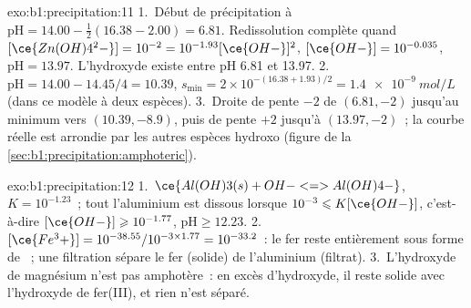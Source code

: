 \begin{solution}{exo:b1:precipitation:11}
1.~Début de précipitation à $\mathrm{pH} = 14.00 - \frac12(16.38 - 2.00) = 6.81$.
Redissolution complète quand $[\ce{Zn(OH)4^2-}] = 10^{-2} = 10^{-1.93}[\ce{OH-}]^2$,
$[\ce{OH-}] = 10^{-0.035}$, $\mathrm{pH} = 13.97$. L'hydroxyde existe
entre pH 6.81 et 13.97.
2.~$\mathrm{pH} = 14.00 - 14.45/4 = 10.39$, $s_{\min} = 2 \times
10^{-(16.38 + 1.93)/2} = \qty{1.4e-9}{mol/L}$ (dans ce modèle à deux
espèces).
3.~Droite de pente $-2$ de $(6.81, -2)$ jusqu'au minimum vers
$(10.39, -8.9)$, puis de pente $+2$ jusqu'à $(13.97, -2)$~; la courbe
réelle est arrondie par les autres espèces hydroxo (figure de la
\cref{sec:b1:precipitation:amphoteric}).
\end{solution}

\begin{solution}{exo:b1:precipitation:12}
1.~$\ce{Al(OH)3(s) + OH- <=> Al(OH)4-}$, $K = 10^{-1.23}$~; tout
l'aluminium est dissous lorsque $10^{-3} \leqslant K[\ce{OH-}]$,
c'est-à-dire
$[\ce{OH-}] \geqslant 10^{-1.77}$, $\mathrm{pH} \geqslant 12.23$.
2.~$[\ce{Fe^3+}] = 10^{-38.55}/10^{-3 \times 1.77} = 10^{-33.2}$~: le fer
reste entièrement sous forme de ~; une filtration sépare le
fer (solide) de l'aluminium (filtrat).
3.~L'hydroxyde de magnésium n'est pas amphotère~: en excès d'hydroxyde,
il reste solide avec l'hydroxyde de fer(III), et rien n'est séparé.
\end{solution}

